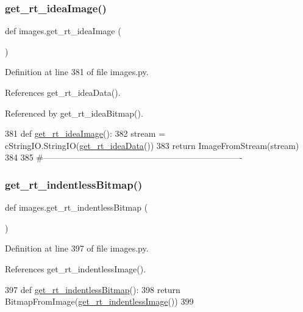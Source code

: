 \subsubsection{\texorpdfstring{get\+\_\+rt\+\_\+idea\+Image()}{get\_rt\_ideaImage()}}
{\footnotesize\ttfamily def images.\+get\+\_\+rt\+\_\+idea\+Image (\begin{DoxyParamCaption}{ }\end{DoxyParamCaption})}



Definition at line 381 of file images.\+py.



References get\+\_\+rt\+\_\+idea\+Data().



Referenced by get\+\_\+rt\+\_\+idea\+Bitmap().


\begin{DoxyCode}
381 \textcolor{keyword}{def }\hyperlink{namespaceimages_a476483666934d1a89f0b20cc805d5ed7}{get\_rt\_ideaImage}():
382     stream = cStringIO.StringIO(\hyperlink{namespaceimages_a37c278ef96ae60271be822aa05328780}{get\_rt\_ideaData}())
383     \textcolor{keywordflow}{return} ImageFromStream(stream)
384 
385 \textcolor{comment}{#----------------------------------------------------------------------}
\end{DoxyCode}
\mbox{\label{namespaceimages_a32bd9d50c996f821dad7aec8a88b1f28}} 
\subsubsection{\texorpdfstring{get\+\_\+rt\+\_\+indentless\+Bitmap()}{get\_rt\_indentlessBitmap()}}
{\footnotesize\ttfamily def images.\+get\+\_\+rt\+\_\+indentless\+Bitmap (\begin{DoxyParamCaption}{ }\end{DoxyParamCaption})}



Definition at line 397 of file images.\+py.



References get\+\_\+rt\+\_\+indentless\+Image().


\begin{DoxyCode}
397 \textcolor{keyword}{def }\hyperlink{namespaceimages_a32bd9d50c996f821dad7aec8a88b1f28}{get\_rt\_indentlessBitmap}():
398     \textcolor{keywordflow}{return} BitmapFromImage(\hyperlink{namespaceimages_a56a4748435e020106beb32db21000723}{get\_rt\_indentlessImage}())
399 
\end{DoxyCode}
\mbox{\label{namespaceimages_afe77e2f882a006343c9553de97d91360}} 
